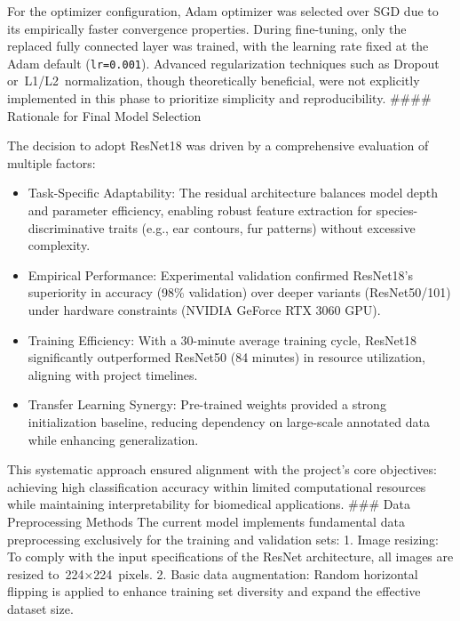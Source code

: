 For the optimizer configuration, \hspace{0pt}\hspace{0pt}Adam
optimizer\hspace{0pt}\hspace{0pt} was selected over SGD due to its
empirically faster convergence properties. During fine-tuning, only the
replaced fully connected layer was trained, with the learning rate fixed
at the Adam default (\texttt{lr=0.001}). Advanced regularization
techniques such as Dropout
or~L1\hspace{0pt}/L2\hspace{0pt}~normalization, though theoretically
beneficial, were not explicitly implemented in this phase to prioritize
simplicity and reproducibility. \#\#\#\# Rationale for Final Model
Selection

The decision to adopt ResNet18 was driven by a comprehensive evaluation
of multiple factors:

\begin{itemize}
\tightlist
\item
  Task-Specific Adaptability: The residual architecture balances model
  depth and parameter efficiency, enabling robust feature extraction for
  species-discriminative traits (e.g., ear contours, fur patterns)
  without excessive complexity.
\item
  Empirical Performance: Experimental validation confirmed ResNet18's
  superiority in accuracy (98\% validation) over deeper variants
  (ResNet50/101) under hardware constraints (NVIDIA GeForce RTX 3060
  GPU).
\item
  Training Efficiency: With a 30-minute average training cycle, ResNet18
  significantly outperformed ResNet50 (84 minutes) in resource
  utilization, aligning with project timelines.
\item
  Transfer Learning Synergy: Pre-trained weights provided a strong
  initialization baseline, reducing dependency on large-scale annotated
  data while enhancing generalization.
\end{itemize}

This systematic approach ensured alignment with the project's core
objectives: achieving high classification accuracy within limited
computational resources while maintaining interpretability for
biomedical applications. \#\#\# Data Preprocessing Methods The current
model implements fundamental data preprocessing exclusively for the
training and validation sets: 1. Image resizing: To comply with the
input specifications of the ResNet architecture, all images are resized
to~224×224~pixels. 2. Basic data augmentation: Random horizontal
flipping is applied to enhance training set diversity and expand the
effective dataset size.

